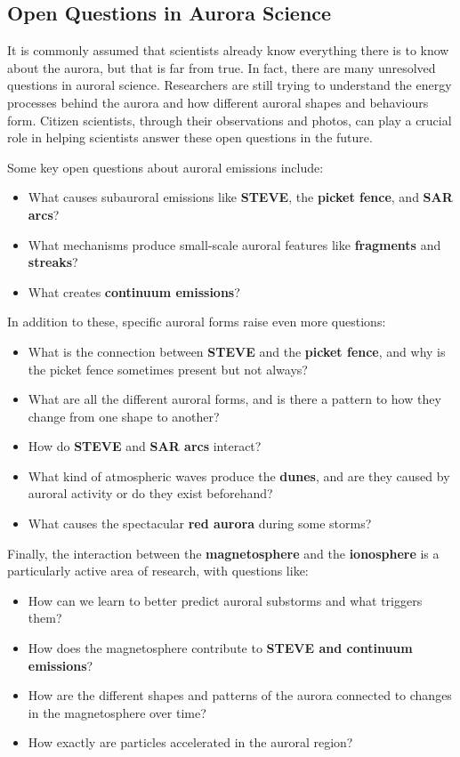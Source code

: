 \documentclass{article}
\begin{document}
\subsection{Open Questions in Aurora Science}

It is commonly assumed that scientists already know everything there is to know about the aurora, but that is far from true. In fact, there are many unresolved questions in auroral science. Researchers are still trying to understand the energy processes behind the aurora and how different auroral shapes and behaviours form. Citizen scientists, through their observations and photos, can play a crucial role in helping scientists answer these open questions in the future.

Some key open questions about auroral emissions include:
\begin{itemize}
    \item What causes subauroral emissions like \textbf{STEVE}, the \textbf{picket fence}, and \textbf{SAR arcs}?
    \item What mechanisms produce small-scale auroral features like \textbf{fragments} and \textbf{streaks}?
    \item What creates \textbf{continuum emissions}?
\end{itemize}

In addition to these, specific auroral forms raise even more questions:
\begin{itemize}
    \item What is the connection between \textbf{STEVE} and the \textbf{picket fence}, and why is the picket fence sometimes present but not always?
    \item What are all the different auroral forms, and is there a pattern to how they change from one shape to another?
    \item How do \textbf{STEVE} and \textbf{SAR arcs} interact?
    \item What kind of atmospheric waves produce the \textbf{dunes}, and are they caused by auroral activity or do they exist beforehand?
    \item What causes the spectacular \textbf{red aurora} during some storms?
\end{itemize}

Finally, the interaction between the \textbf{magnetosphere} and the \textbf{ionosphere} is a particularly active area of research, with questions like:
\begin{itemize}
    \item How can we learn to better predict auroral substorms and what triggers them?
    \item How does the magnetosphere contribute to \textbf{STEVE and continuum emissions}?
    \item How are the different shapes and patterns of the aurora connected to changes in the magnetosphere over time?
    \item How exactly are particles accelerated in the auroral region?

    
\end{itemize}
\end{document}
